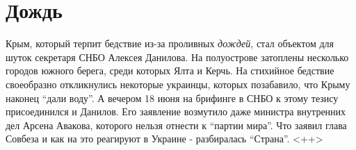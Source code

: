  
 
 
 
 
\chapter{Дождь}

Крым, который терпит бедствие из-за проливных \emph{дождей}, стал объектом для шуток
секретаря СНБО Алексея Данилова. 
На полуострове затоплены несколько городов южного берега, среди которых Ялта и
Керчь. На стихийное бедствие своеобразно откликнулись некоторые украинцы,
которых позабавило, что Крыму наконец \enquote{дали воду}.
А вечером 18 июня на брифинге в СНБО к этому тезису присоединился и Данилов.
Его заявление возмутило даже министра внутренних дел Арсена Авакова, которого
нельзя отнести к \enquote{партии мира}. 
Что заявил глава Совбеза и как на это реагируют в Украине - разбиралась
\enquote{Страна}.
  <++>
